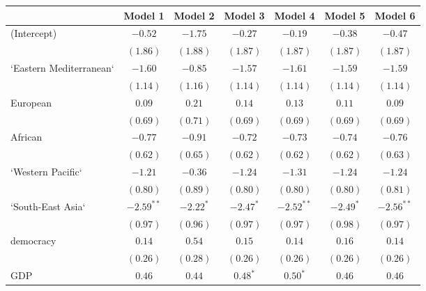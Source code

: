 
\begin{table}[!h]
\begin{center}
\begin{tabular}{l c c c c c c }
\toprule
 & Model 1 & Model 2 & Model 3 & Model 4 & Model 5 & Model 6 \\
\midrule
(Intercept)             & $-0.52$      & $-1.75$      & $-0.27$      & $-0.19$      & $-0.38$      & $-0.47$      \\
                        & $(1.86)$     & $(1.88)$     & $(1.87)$     & $(1.87)$     & $(1.87)$     & $(1.87)$     \\
`Eastern Mediterranean` & $-1.60$      & $-0.85$      & $-1.57$      & $-1.61$      & $-1.59$      & $-1.59$      \\
                        & $(1.14)$     & $(1.16)$     & $(1.14)$     & $(1.14)$     & $(1.14)$     & $(1.14)$     \\
European                & $0.09$       & $0.21$       & $0.14$       & $0.13$       & $0.11$       & $0.09$       \\
                        & $(0.69)$     & $(0.71)$     & $(0.69)$     & $(0.69)$     & $(0.69)$     & $(0.69)$     \\
African                 & $-0.77$      & $-0.91$      & $-0.72$      & $-0.73$      & $-0.74$      & $-0.76$      \\
                        & $(0.62)$     & $(0.65)$     & $(0.62)$     & $(0.62)$     & $(0.62)$     & $(0.63)$     \\
`Western Pacific`       & $-1.21$      & $-0.36$      & $-1.24$      & $-1.31$      & $-1.24$      & $-1.24$      \\
                        & $(0.80)$     & $(0.89)$     & $(0.80)$     & $(0.80)$     & $(0.80)$     & $(0.81)$     \\
`South-East Asia`       & $-2.59^{**}$ & $-2.22^{*}$  & $-2.47^{*}$  & $-2.52^{**}$ & $-2.49^{*}$  & $-2.56^{**}$ \\
                        & $(0.97)$     & $(0.96)$     & $(0.97)$     & $(0.97)$     & $(0.98)$     & $(0.97)$     \\
democracy               & $0.14$       & $0.54$       & $0.15$       & $0.14$       & $0.16$       & $0.14$       \\
                        & $(0.26)$     & $(0.28)$     & $(0.26)$     & $(0.26)$     & $(0.26)$     & $(0.26)$     \\
GDP                     & $0.46$       & $0.44$       & $0.48^{*}$   & $0.50^{*}$   & $0.46$       & $0.46$       \\

\end{tabular}
\end{center}
\end{table}
